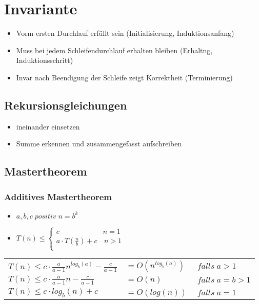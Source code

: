 \documentclass{article}
\begin{document}
\section{Invariante}
\begin{itemize}
\item Vorm ersten Durchlauf erf{\"u}llt sein (Initialisierung, Induktionsanfang)
\item Muss bei jedem Schleifendurchlauf erhalten bleiben (Erhaltng, Induktionsschritt)
\item Invar nach Beendigung der Schleife zeigt Korrektheit (Terminierung)
\end{itemize}

 
\subsection{Rekursionsgleichungen}
\begin{itemize}
\item ineinander einsetzen
\item Summe erkennen und zusammengefasst aufschreiben
\end{itemize}
\subsection{Mastertheorem}
\subsubsection{Additives Mastertheorem}
\begin{itemize}
\item $ a,b,c \; positiv \; n= b^k$
\item $T (n) \leq \left\{
\begin{array}{ll}
c & n  = 1 \\
a\cdot T(\frac{n}{b}) +c & \, n>1 \\
\end{array}
\right. $
\end{itemize}
\begin{tabular}{l l  l}

$T(n) \leq c\cdot \frac{a}{a-1}n^{log_b(a)} - \frac{c}{a-1}  $&$= O(n^{log_b(a)}) $&$ \; falls \; a>1$ \\
$T(n) \leq c\cdot \frac{a}{a-1}n - \frac{c}{a-1} $&$ = O(n)  $& $\; falls \; a=b>1$\\
$T(n) \leq c\cdot log_b(n) +c  $&$= O(log(n)) $&$\; falls \; a=1$\\
\end{tabular}
\end{document}
